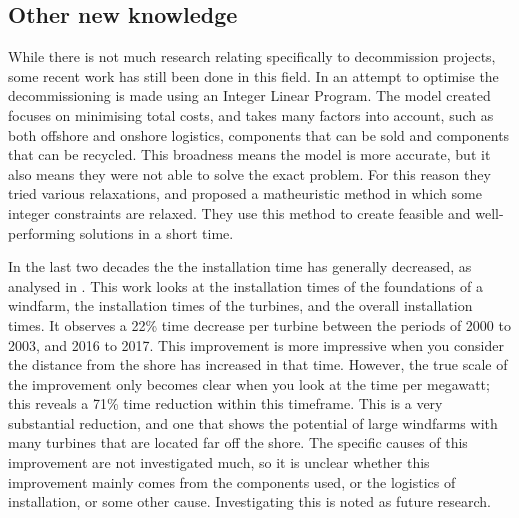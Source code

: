 \documentclass[a4paper,12pt]{article}
\begin{document}
\subsection{Other new knowledge} \label{ss:othnew}
While there is not much research relating specifically to decommission projects, some recent work has still been done in this field. In \cite{irawan2019optimisation} an attempt to optimise the decommissioning is made using an Integer Linear Program. The model created focuses on minimising total costs, and takes many factors into account, such as both offshore and onshore logistics, components that can be sold and components that can be recycled. This broadness means the model is more accurate, but it also means they were not able to solve the exact problem. For this reason they tried various relaxations, and proposed a matheuristic method in which some integer constraints are relaxed. They use this method to create feasible and well-performing solutions in a short time.

\bigskip

In the last two decades the the installation time has generally decreased, as analysed in \cite{lacal2018offshore}. This work looks at the installation times of the foundations of a windfarm, the installation times of the turbines, and the overall installation times. It observes a 22\% time decrease per turbine between the periods of 2000 to 2003, and 2016 to 2017. This improvement is more impressive when you consider the distance from the shore has increased in that time. However, the true scale of the improvement only becomes clear when you look at the time per megawatt; this reveals a 71\% time reduction within this timeframe. This is a very substantial reduction, and one that shows the potential of large windfarms with many turbines that are located far off the shore. The specific causes of this improvement are not investigated much, so it is unclear whether this improvement mainly comes from the components used, or the logistics of installation, or some other cause. Investigating this is noted as future research. 

\bigskip
\end{document}
